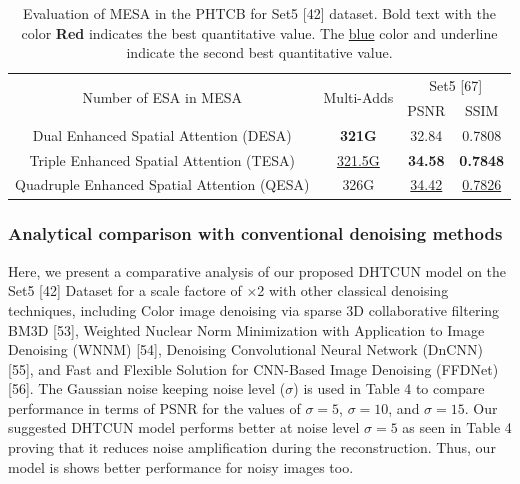 \documentclass{ieeeaccess}
\begin{document}
\begin{table} 
\centering
\caption{Evaluation of MESA in the PHTCB for Set5 [42] dataset. Bold text with the color {\color{red}\textbf{Red }} indicates the best quantitative value. The {\color{blue}\underline{blue}} color and underline indicate the second best quantitative value.}

\label{table5}
\setlength{\tabcolsep}{3 pt}
\begin{tabular}{|c|c|cc|}
\hline
\multirow{2}{*}{Number of ESA in MESA} & \multirow{2}{*}{Multi-Adds} & \multicolumn{2}{c|}{Set5 [67]}  \\

\cline{3-4}&& \multicolumn{1}{c|}{PSNR}  & SSIM        \\

\hline

Dual Enhanced Spatial Attention (DESA) &{\color{red}\textbf{321G}} &\multicolumn {1}{c|}{32.84 } & 0.7808  \\

Triple Enhanced Spatial Attention (TESA) &{\color{blue}\underline{321.5G}} &\multicolumn {1}{c|}{\color{red}\textbf{34.58}} & {\color{red}\textbf{0.7848}}  \\

Quadruple Enhanced Spatial Attention (QESA) &326G &\multicolumn {1}{c|}{\color{blue}\underline{34.42}} & {\color{blue}\underline{0.7826}}  \\


\hline

\end{tabular}
\end{table}


\subsubsection{Analytical comparison with conventional denoising methods}

Here, we present a comparative analysis of our proposed DHTCUN model on the Set5 [42] Dataset for a scale factore of $\times$2 with other classical denoising techniques, including Color image denoising via sparse 3D collaborative filtering BM3D [53], Weighted Nuclear Norm Minimization with Application to Image Denoising (WNNM) [54], Denoising Convolutional Neural Network (DnCNN) [55], and Fast and Flexible Solution for CNN-Based Image Denoising (FFDNet) [56]. The Gaussian noise keeping noise level ($\sigma$) is used in Table 4 to compare performance in terms of PSNR for the values of $\sigma = 5$, $\sigma = 10$, and $\sigma = 15$. Our suggested DHTCUN model performs better at noise level $\sigma = 5$ as seen in Table 4 proving that it reduces noise amplification during the reconstruction. Thus, our model is shows better performance for noisy images too.
\end{document}
